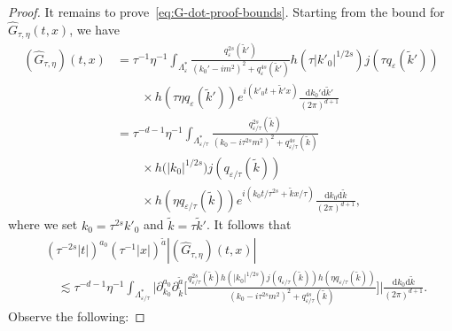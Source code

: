 \documentclass{article}
\numberwithin{equation}{section}
\newcommand{\mathd}{\mathrm{d}}
\theoremstyle{plain}
\theoremstyle{definition}
\begin{document}
\begin{proof}
  It remains to prove~\eqref{eq:G-dot-proof-bounds}. Starting from the bound
  for $\hat{G}_{\tau, \eta} (t, x)$, we have
  \begin{align*}
       (\hat{G}_{\tau, \eta}) (t, x)
       &= \tau^{- 1} \eta^{- 1} \int_{\Lambda^{\ast}_{\varepsilon}}
       \frac{q^{2 s}_{\varepsilon} (\tilde{k}')}
       {(k_0' - i m^2)^2 + q^{4 s}_{\varepsilon}(\tilde{k}')}
       h \left( \tau | k'_0 |^{1 / 2 s}  \right)
       j (\tau q_{\varepsilon} (\tilde{k}') )\\
       &\qquad \times
       h (\tau \eta q_{\varepsilon}(\tilde{k}'))
       e^{i (k'_0 t + \tilde{k}' x)}
       \frac{\mathd k_0' \mathd \tilde{k}'}{(2 \pi)^{d + 1}}\\
       &= \tau^{- d - 1} \eta^{- 1}
       \int_{\Lambda^{\ast}_{\varepsilon / \tau}}
       \frac{q^{2 s}_{\varepsilon / \tau} (\tilde{k})}
       {(k_0 - i \tau^{2 s} m^2)^2
       + q^{4 s}_{\varepsilon / \tau}(\tilde{k})}
       \\
       &\qquad \times h \big( | k_0 |^{1 / 2 s}  \big)
       j (q_{\varepsilon / \tau} (\tilde{k}))\\
       &\qquad \times
       h (\eta q_{\varepsilon / \tau}(\tilde{k}))
       e^{i(k_0 t / \tau^{2 s} + \tilde{k} x / \tau)}
       \frac{\mathd k_0 \mathd \tilde{k}}{(2 \pi)^{d + 1}},
  \end{align*}
  where we set $k_0 = \tau^{2 s} {k'_0} $ and $\tilde{k} = \tau \tilde{k}'$.
  It follows that
  \begin{equation}
    \begin{aligned}
      &(\tau^{- 2 s} | t |)^{a_0} (\tau^{- 1} | x |)^{\tilde{a}}
      | (\hat{G}_{\tau, \eta}) (t, x) |\\
      &\quad \lesssim \tau^{- d - 1} \eta^{- 1}
      \int_{\Lambda^{\ast}_{\varepsilon / \tau}}
      \Bigg| \partial_{k_0}^{a_0}
      \partial_{\tilde{k}}^{\tilde{a}} \Bigg[
      \frac{q^{2 s}_{\varepsilon / \tau}(\tilde{k})
      h \left( | k_0 |^{1 / 2 s}  \right)
      j(q_{\varepsilon / \tau}(\tilde{k}))
      h(\eta q_{\varepsilon / \tau}(\tilde{k}))}
      {(k_0 - i \tau^{2 s} m^2)^2
      + q^{4 s}_{\varepsilon / \tau}(\tilde{k})}
       \Bigg] \Bigg|
      \frac{\mathd k_0 \mathd \tilde{k}}{(2 \pi)^{d + 1}} .
    \end{aligned} \label{eq:integral-to-control}
  \end{equation}
  Observe the following:
\end{proof}
\end{document}
